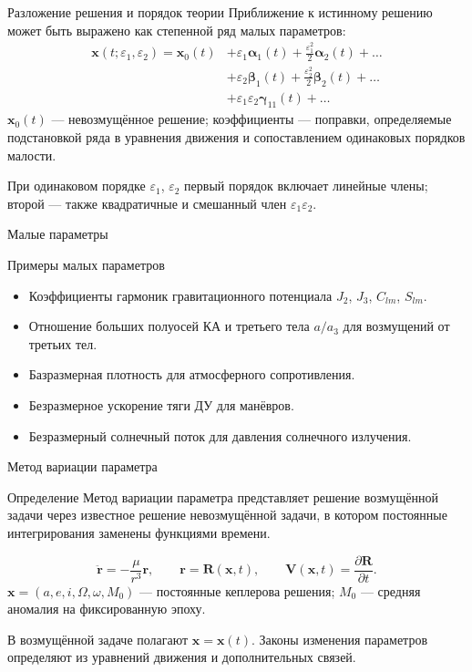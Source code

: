\documentclass[11pt,aspectratio=169,t]{beamer}
\begin{document}
\begin{frame}{Разложение решения и порядок теории}
Приближение к истинному решению может быть выражено как степенной ряд малых параметров:
\setlength{\abovedisplayskip}{4pt}\setlength{\belowdisplayskip}{4pt}
\[
\begin{aligned}
\mathbf x(t;\varepsilon_1,\varepsilon_2) =
\mathbf x_0(t) &+ \varepsilon_1\boldsymbol\alpha_1(t) + \frac{\varepsilon_1^2}{2}\boldsymbol\alpha_2(t) + \dots \\
&+ \varepsilon_2\boldsymbol\beta_1(t) + \frac{\varepsilon_2^2}{2}\boldsymbol\beta_2(t) + \dots \\
&+\varepsilon_1\varepsilon_2\boldsymbol\gamma_{11}(t) + \dots
\end{aligned}
\]
\justifying
$\mathbf x_0(t)$ --- невозмущённое решение; коэффициенты --- поправки, определяемые подстановкой ряда в уравнения движения и сопоставлением одинаковых порядков малости.

При одинаковом порядке $\varepsilon_1$, $\varepsilon_2$ первый порядок включает линейные члены; второй --- также квадратичные и смешанный член $\varepsilon_1\varepsilon_2$.

\end{frame}

\begin{frame}{Малые параметры}
\begin{block}{Примеры малых параметров}
\begin{itemize}
\item Коэффициенты гармоник гравитационного потенциала $J_2$, $J_3$, $C_{lm}$, $S_{lm}$.
\item Отношение больших полуосей КА и третьего тела $a/a_3$ для возмущений от третьих тел.
\item Базразмерная плотность для атмосферного сопротивления.
\item Безразмерное ускорение тяги ДУ для манёвров.
\item Безразмерный солнечный поток для давления солнечного излучения.
\end{itemize}
\end{block}

\end{frame}

\begin{frame}{Метод вариации параметра}
\setlength{\abovedisplayskip}{4pt}\setlength{\belowdisplayskip}{4pt}
\begin{block}{Определение}
\justifying
Метод вариации параметра представляет решение возмущённой задачи через известное решение невозмущённой задачи, в котором постоянные интегрирования заменены функциями времени.
\end{block}
\[
\ddot{\mathbf r}=-\frac{\mu}{r^3}\mathbf r,
\qquad \mathbf r=\mathbf R(\mathbf x,t),
\qquad \mathbf V(\mathbf x,t)=\frac{\partial\mathbf R}{\partial t}.
\]
\justifying
$\mathbf x=(a,e,i,\Omega,\omega,M_0)$ --- постоянные кеплерова решения; $M_0$ --- средняя аномалия на фиксированную эпоху.\par\smallskip
В возмущённой задаче полагают $\mathbf x=\mathbf x(t)$. Законы изменения параметров определяют из уравнений движения и дополнительных связей.
\end{frame}
\end{document}

